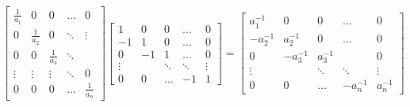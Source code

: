 \documentclass{article}
\begin{document}
\begin{equation*}
    \begin{bmatrix}
        \frac{1}{a_{1}}& 0 & 0 & \dots & 0 \\
    0 & \frac{1}{a_{2}}& 0 & \ddots & \vdots \\
    0& 0 & \frac{1}{a_{3}} & \ddots & \\
    \vdots & \vdots & \vdots& \ddots & 0 \\
    0 & 0 & 0 & \dots & \frac{1}{a_{n}}
    \end{bmatrix}\begin{bmatrix}
        1 & 0 & 0 & \dots & 0 \\
        -1 & 1 & 0 & \dots & 0 \\
        0 & -1 & 1 & \dots & 0 \\
        \vdots & & \ddots & \ddots & \vdots\\
        0 & 0 & \dots & -1 & 1
    \end{bmatrix} = \begin{bmatrix}
        a_{1}^{-1} & 0 & 0 & \dots& 0 \\
        -a_{2}^{-1} & a_{2}^{-1} & 0 &\dots & 0 \\
        0 & -a_{3}^{-1} & a_{3}^{-1} &  & 0 \\
        \vdots &  & \ddots & \ddots & \vdots \\
        0 & 0 & \dots & -a_{n}^{-1} & a_{n}^{-1}
    \end{bmatrix}
\end{equation*}

\pagebreak
\end{document}
